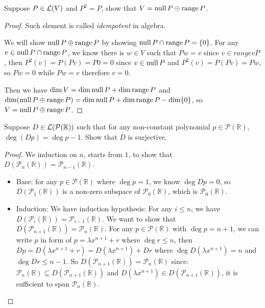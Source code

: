 \documentclass[../main.tex]{subfiles}
\begin{document}
\begin{exercise}
  Suppose $P \in \mathcal{L}(V)$ and $P^2 = P$, show that $V = \operatorname{null} P \oplus \operatorname{range} P$.
\end{exercise}
\begin{proof}
  Such element is called \textit{idempotent} in algebra.

  We will show $\operatorname{null} P \oplus \operatorname{range} P$ by showing $\operatorname{null} P \cap \operatorname{range} P = \{0\}$.
  For any $v \in \operatorname{null} P \cap \operatorname{range} P$, we know there is $w \in V$ such that $Pw = v$
  since $v \in rangev P$, then $P^2(v) = P(Pv) = P0 = 0$ since $v \in \operatorname{null} P$
  and $P^2(v) = P(Pv) = Pw$, so $Pw = 0$ while $Pw = v$ therefore $v = 0$.

  Then we have $\dim V = \dim \operatorname{null} P + \dim \operatorname{range} P$ and $\dim (\operatorname{null} P \oplus \operatorname{range} P) = \dim \operatorname{null} P + \dim \operatorname{range} P - \dim \{0\}$,
  so $V = \operatorname{null} P \oplus \operatorname{range} P$.
\end{proof}

\begin{exercise}
  Suppose $D \in \mathcal{L}(\mathcal{P}(\mathbb{R}))$ such that for any non-constant polynomial
  $p \in \mathcal{P}(\mathbb{R})$, $\deg (Dp) = \deg p - 1$. Show that $D$ is surjective.
\end{exercise}
\begin{proof}
  We induction on $n$, starts from $1$, to show that
  $D(\mathcal{P}_n(\mathbb{R})) = \mathcal{P}_{n - 1}(\mathbb{R})$.

  \begin{itemize}
    \item Base: for any $p \in \mathcal{P}(\mathbb{R})$ where $\deg p = 1$, we know $\deg Dp = 0$,
          so $D(\mathcal{P}_1(\mathbb{R}))$ is a non-zero subspace of $\mathcal{P}_0(\mathbb{R})$,
          which is $\mathcal{P}_0(\mathbb{R})$.
    \item Induction: We have induction hypothesis: For any $i \le n$, we have $D(\mathcal{P}_i(\mathbb{R})) = \mathcal{P}_{i - 1}(\mathbb{R})$.
          We want to show that $D(\mathcal{P}_{n + 1}(\mathbb{R})) = \mathcal{P}_{n}(\mathbb{R})$.
          For any $p \in \mathcal{P}(\mathbb{R})$ with $\deg p = n + 1$, we can write $p$ in form
          of $p = \lambda x^{n + 1} + r$ where $\deg r \le n$,
          then $Dp = D(\lambda x^{n + 1} + r) = D(\lambda x^{n + 1}) + Dr$ where $\deg D(\lambda x^{n + 1}) = n$ and $\deg Dr \le n - 1$.
          So $D(\mathcal{P}_{n + 1}(\mathbb{R})) = \mathcal{P}_n(\mathbb{R})$ since:
          $\mathcal{P}_n(\mathbb{R}) \subseteq D(\mathcal{P}_{n + 1}(\mathbb{R}))$ and $D(\lambda x^{n + 1}) \in D(\mathcal{P}_{n + 1}(\mathbb{R}))$,
          it is sufficient to span $\mathcal{P}_n(\mathbb{R})$.
  \end{itemize}
\end{proof}
\end{document}
